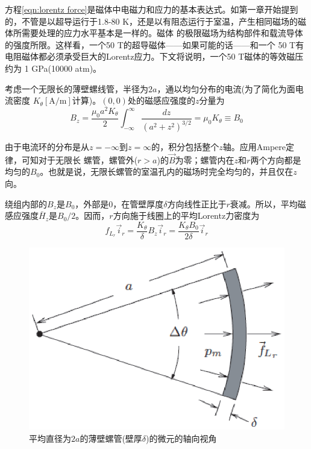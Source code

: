方程\ref{eqn:lorentz force}是磁体中电磁力和应力的基本表达式。如第一章开始提到的，不管是以超导运行于1.8-80 K，还是以有阻态运行于室温，产生相同磁场的磁体所需要处理的应力水平基本是一样的。磁体
的极限磁场为结构部件和载流导体的强度所限。这样看，一个50 T的超导磁体——如果可能的话——和一个
50 T有电阻磁体都必须承受巨大的Lorentz应力。下文将说明，一个50 T磁体的等效磁压约为
1 GPa(10000 atm)。

考虑一个无限长的薄壁螺线管，半径为$2a$，通以均匀分布的电流(为了简化为面电流密度
$K_\theta [\mathrm{A/m}]$计算)。$(0,0)$处的磁感应强度的$z$分量为
\begin{equation}\label{eqn:inf solenoid}
  B_z=\frac{\mu_0 a^2 K_\theta}{2}\int_{-\infty}^{\infty}\frac{dz}{(a^2+z^2)^{3/2}}=\mu_0 K_\theta\equiv B_0
\end{equation}

由于电流环的分布是从$z=-\infty$到$z=\infty$的，积分包括整个$z$轴。应用Ampere定律，可知对于无限长
螺管，螺管外($r>a$)的$\vec{B}$为零；螺管内在$z$和$r$两个方向都是均匀的$B_0$。也就是说，无限长螺管的室温孔内的磁场时完全均匀的，并且仅在$z$向。

绕组内部的$B_z$是$B_0$，外部是$0$，在管壁厚度$\delta$方向线性正比于$r$衰减。所以，平均磁感应强度$\bar{H}_z$是$B_0/2$。因而，$r$方向施于线圈上的平均Lorentz力密度为
\begin{equation}\label{eqn:inf solenoid fl}
  f_{L_r}\vec{i}_r=\frac{K_\theta}{\delta}B_z \vec{i}_r=\frac{K_\theta B_0}{2\delta}\vec{i}_r
\end{equation}

\begin{figure}[htbp]
  \centering
 \includegraphics[scale=0.6]{chpt3/figs/fig3.2.eps}
  \caption{平均直径为$2a$的薄壁螺管(壁厚$\delta$)的微元的轴向视角}
\end{figure}

